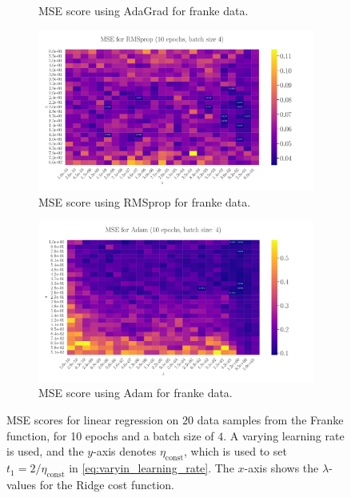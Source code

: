 \documentclass[%
reprint,s
amsmath,amssymb,
aps,
]{revtex4-2}
\begin{document}
\begin{figure}
\begin{subfigure}{0.41\textwidth}
		\caption{MSE score using AdaGrad for franke data.}
		\label{fig:LinReg25x25_epoch10_bacthS50_zoomed}
	\end{subfigure}
\hfill\newline
	\begin{subfigure}{0.41\textwidth}
		\includegraphics[width=\textwidth]{Figures/LinRegRMSprop_25x25_epoch10_batchS4.pdf}
		\caption{MSE score using RMSprop for franke data.}
		\label{fig:LinReg25x25_epoch100_bacthS50}
	\end{subfigure}
	\hfill
	\begin{subfigure}{0.41\textwidth}
		\includegraphics[width=\textwidth]{Figures/LinRegAdam_25x25_epoch10_batchS4_zoomed.pdf}
		\caption{MSE score using Adam for franke data.}
		\label{fig:LinReg25x25_epoch100_bacthS50_zoomed}
	\end{subfigure}
	\caption{MSE scores for linear regression on \(20\) data samples from the Franke function, for 10 epochs and a batch size of \(4\). A varying learning rate is used, and the \(y\)-axis denotes \(\eta_{\text{const}}\), which is used to set \(t_1=2/\eta_{\text{const}}\) in \eqref{eq:varyin_learning_rate}. The \(x\)-axis shows the \(\lambda\)-values for the Ridge cost function.}
	\label{fig:LinReg}
\end{figure}
\end{document}
